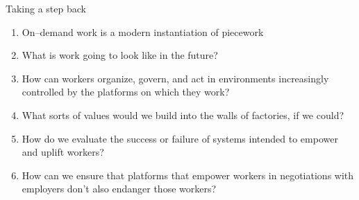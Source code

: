 \documentclass[presentation]{subfiles}
\begin{document}


\begin{frame}{Taking a step back}
\begin{enumerate}
  \item On--demand work is a modern instantiation of piecework
  \item What is work going to look like in the future?
  \item How can workers \alert{organize}, \alert{govern}, and \alert{act} in environments increasingly controlled by the platforms on which they work?
  \item What sorts of \alert{values} would we build into the walls of factories, if we could?
  \item How do we \alert{evaluate} the success or failure of systems intended to empower and uplift workers?
  \item How can we ensure that platforms that empower workers in negotiations with employers don't also \alert{endanger} those workers?
\end{enumerate}
\end{frame}


\end{document}
